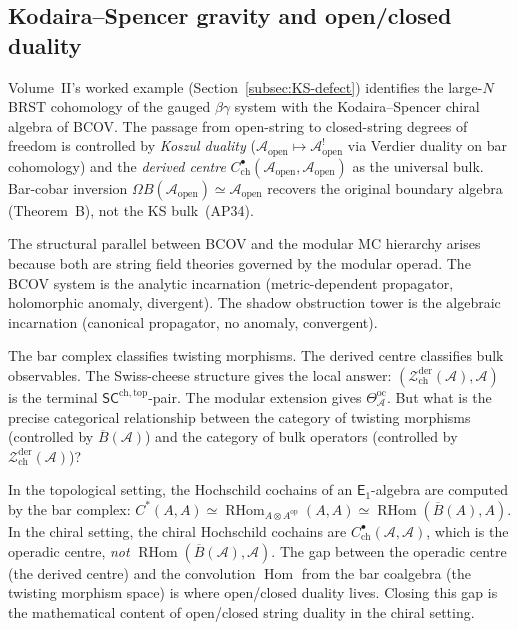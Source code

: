 \documentclass[11pt]{article}
\newcommand{\cA}{\mathcal{A}}
\newcommand{\cZ}{\mathcal{Z}}
\newcommand{\barB}{\overline{B}}
\newcommand{\Eone}{\mathsf{E}_1}
\newcommand{\SCchtop}{\mathsf{SC}^{\mathrm{ch,top}}}
\newcommand{\Hom}{\operatorname{Hom}}
\newcommand{\RHom}{\operatorname{RHom}}
\newcommand{\Zder}{\cZ^{\mathrm{der}}_{\mathrm{ch}}}
\begin{document}
\subsection{Kodaira--Spencer gravity and open/closed duality}

Volume~II's worked example (Section~\ref{subsec:KS-defect})
identifies the large-$N$ BRST cohomology of the gauged
$\beta\gamma$ system with the Kodaira--Spencer chiral algebra
of BCOV.  The passage from open-string to closed-string
degrees of freedom is controlled by \emph{Koszul duality}
($\cA_{\mathrm{open}} \mapsto \cA^!_{\mathrm{open}}$ via
Verdier duality on bar cohomology) and the \emph{derived
centre} $C^\bullet_{\mathrm{ch}}(\cA_{\mathrm{open}},
\cA_{\mathrm{open}})$ as the universal bulk.  Bar-cobar
inversion $\Omega B(\cA_{\mathrm{open}}) \simeq
\cA_{\mathrm{open}}$ recovers the original boundary algebra
(Theorem~B), not the KS bulk~(AP34).

The structural parallel between BCOV and the modular MC
hierarchy arises because both are string field theories governed
by the modular operad.  The BCOV system is the analytic
incarnation (metric-dependent propagator, holomorphic anomaly,
divergent).  The shadow obstruction tower is the algebraic incarnation
(canonical propagator, no anomaly, convergent).

\begin{question}
\label{q:open-closed-vol2}
The bar complex classifies twisting morphisms.  The derived
centre classifies bulk observables.  The Swiss-cheese structure
gives the local answer: $(\Zder(\cA), \cA)$ is the terminal
$\SCchtop$-pair.  The modular extension gives
$\Theta^{\mathrm{oc}}_\cA$.  But what is the precise categorical
relationship between the category of twisting morphisms
(controlled by $\barB(\cA)$) and the category of bulk operators
(controlled by $\Zder(\cA)$)?

In the topological setting, the Hochschild cochains of an
$\Eone$-algebra are computed by the bar complex: $C^*(A,A)
\simeq \RHom_{A \otimes A^{\mathrm{op}}}(A,A) \simeq
\RHom(\barB(A), A)$.  In the chiral setting, the chiral
Hochschild cochains are $C^\bullet_{\mathrm{ch}}(\cA,\cA)$,
which is the operadic centre, \emph{not} $\RHom(\barB(\cA),
\cA)$.  The gap between the operadic centre (the derived
centre) and the convolution $\Hom$ from the bar coalgebra
(the twisting morphism space) is where open/closed duality
lives.  Closing this gap is the mathematical content of
open/closed string duality in the chiral setting.
\end{question}
\end{document}
